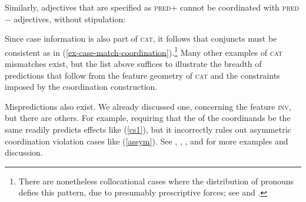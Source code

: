 \documentclass[output=paper
                ,modfonts
                ,nonflat
	        ,collection
	        ,collectionchapter
	        ,collectiontoclongg
 	        ,biblatex
                ,babelshorthands
                ,newtxmath
                ,draftmode
                ,colorlinks, citecolor=brown
]{./langsci/langscibook}
\begin{document}
{
\zl

Similarly, adjectives that are specified as \textsc{pred}$+$ cannot be
coordinated with  \textsc{pred}$-$ adjectives, without stipulation:

\eal
{}
\zl


\noindent
Since case information is also part of \textsc{cat}, it follows that conjuncts must be consistent as in (\ref{ex-case-match-coordination}).\footnote{There are nonetheless collocational cases where the distribution of pronouns defies this pattern, due to presumably prescriptive forces; see \citet{grano} and \citet{binomial}.}
 Many other examples of \textsc{cat} mismatches exist, but the  list above suffices to
illustrate the breadth of predictions that follow from the feature geometry of \textsc{cat} and the constraints imposed by
the coordination construction.

\eal
\label{ex-case-match-coordination}
\zl




Mispredictions also exist. We already discussed one, concerning the feature \textsc{inv}, but there are others. For example, requiring that the \slashv of the coordinands be the same readily predicts  effects like 
(\ref{cs1}), but it incorrectly rules out asymmetric coordination violation cases like (\ref{assym}). 
See \citet{goldsmith}, \citet{lakoff86}, \citet{levinprince86}, and \citet{kehler} for more examples and discussion.


\begin{exe}
\ex \begin{xlista}


\end{xlista}
\end{exe}}
\end{document}
